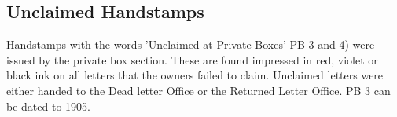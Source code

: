  
\subsection{Unclaimed Handstamps}

Handstamps with the words 'Unclaimed at Private Boxes' 
PB 3 and 4) were issued by the private box section. These are 
found impressed in red, violet or black ink on all letters that 
the owners failed to claim. Unclaimed letters were either handed 
to the Dead letter Office or the Returned Letter Office. 
PB 3 can be dated to 1905.




 


	 
          